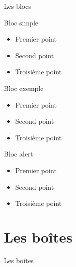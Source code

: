 \documentclass{bredelebeamer}
\begin{document}
\begin{frame}{Les blocs}

\begin{block}{Bloc simple}
\begin{itemize}
\item Premier point
\item Second point
\item Troisième point
\end{itemize}
\end{block}

\begin{exampleblock}{Bloc exemple}
\begin{itemize}
\item Premier point
\item Second point
\item Troisième point
\end{itemize}
\end{exampleblock}

\begin{alertblock}{Bloc alert}
\begin{itemize}
\item Premier point
\item Second point
\item Troisième point
\end{itemize}
\end{alertblock}
\end{frame}


\section{Les bo\^ites}

\begin{frame}{Les boites}

\begin{columns}

\begin{column}{0.5\textwidth}


\end{column}

\begin{column}{0.5\textwidth}



\end{column}

\end{columns}


\end{frame}
\end{document}
